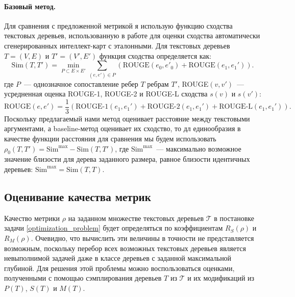 \documentclass[12pt]{article}
\begin{document}
\paragraph{Базовый метод.} Для сравнения с предложенной метрикой я использую функцию сходства текстовых деревьев, использованную в работе \cite{zhang2024coreference} для оценки сходства автоматически сгенерированных интеллект-карт с эталонными. Для текстовых деревьев $T=(V, E)$ и $T'=(V',E')$ функция сходства определяется как:
$$
\text{Sim}(T, T') = \min\limits_{P\subset E\times E'} \sum\limits_{(e, e')\in P}\left(\text{ROUGE}(e_0, e'_0) + \text{ROUGE}(e_1, e_1')\right).
$$
где $P$~--- однозначное сопоставление ребер $T$ ребрам $T'$, ROUGE$(v, v')$~--- усредненная оценка ROUGE-1, ROUGE-2 и ROUGE-L сходства $s(v)$ и $s(v')$:
$$
\text{ROUGE}(e, e') = \frac{1}{3}\left(\text{ROUGE-1}(e_1, e_1')+\text{ROUGE-2}(e_1, e_1')+\text{ROUGE-L}(e_1, e_1')\right).
$$
Поскольку предлагаемый нами метод оценивает расстояние между текстовыми аргументами, а baseline-метод оценивает их сходство, то дл единообразия в качестве функции расстояния для сравнения мы будем использовать $\rho_0(T, T') = \text{Sim}^{\text{max}}-\text{Sim}(T, T')$, где $\text{Sim}^{\text{max}}$~--- максимально возможное значение близости для дерева заданного размера, равное близости идентичных деревьев: $\text{Sim}^{\text{max}} = \text{Sim}(T, T)$.

\subsection{Оценивание качества метрик}

Качество метрики $\rho$ на заданном множестве текстовых деревьев $\mathcal{T}$ в постановке задачи \eqref{optimization_problem} будет определяться по коэффициентам $R_S(\rho)$ и $R_M(\rho)$. Очевидно, что вычислить эти величины в точности не представляется возможным, поскольку перебор всех возможных текстовых деревьев является невыполнимой задачей даже в классе деревьев с заданной максимальной глубиной. Для решения этой проблемы можно воспользоваться оценками, полученными с помощью сэмплирования деревьев $T$ из $\mathcal{T}$ и их модификаций из $P(T)$, $S(T)$ и $M(T)$.
\end{document}
